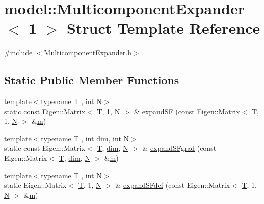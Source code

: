 \hypertarget{structmodel_1_1_multicomponent_expander_3_011_01_4}{}\section{model\+:\+:Multicomponent\+Expander$<$ 1 $>$ Struct Template Reference}
\label{structmodel_1_1_multicomponent_expander_3_011_01_4}


{\ttfamily \#include $<$Multicomponent\+Expander.\+h$>$}

\subsection*{Static Public Member Functions}
\begin{DoxyCompactItemize}
\item 
{\footnotesize template$<$typename T , int N$>$ }\\static const Eigen\+::\+Matrix$<$ \hyperlink{_spline_node_base__corder1_8h_a82692d3a5502b91460591f1d5504314a}{T}, 1, \hyperlink{thompson__tetrahedron_8m_a7823765a845eb81829f110d8337f81ae}{N} $>$ \& \hyperlink{structmodel_1_1_multicomponent_expander_3_011_01_4_a39e9d28d9850305d7a393e0a07779f37}{expand\+S\+F} (const Eigen\+::\+Matrix$<$ \hyperlink{_spline_node_base__corder1_8h_a82692d3a5502b91460591f1d5504314a}{T}, 1, \hyperlink{thompson__tetrahedron_8m_a7823765a845eb81829f110d8337f81ae}{N} $>$ \&\hyperlink{_longest_processing_time_8m_aa45df908642118b77cda186b3250197c}{m})
\item 
{\footnotesize template$<$typename T , int dim, int N$>$ }\\static const Eigen\+::\+Matrix$<$ \hyperlink{_spline_node_base__corder1_8h_a82692d3a5502b91460591f1d5504314a}{T}, \hyperlink{plot_nd_a_8m_a382f3ca768b275b8d563604f7fc7df73}{dim}, \hyperlink{thompson__tetrahedron_8m_a7823765a845eb81829f110d8337f81ae}{N} $>$ \& \hyperlink{structmodel_1_1_multicomponent_expander_3_011_01_4_ac5356ba3b0ee33742873fb5ec09d4066}{expand\+S\+Fgrad} (const Eigen\+::\+Matrix$<$ \hyperlink{_spline_node_base__corder1_8h_a82692d3a5502b91460591f1d5504314a}{T}, \hyperlink{plot_nd_a_8m_a382f3ca768b275b8d563604f7fc7df73}{dim}, \hyperlink{thompson__tetrahedron_8m_a7823765a845eb81829f110d8337f81ae}{N} $>$ \&\hyperlink{_longest_processing_time_8m_aa45df908642118b77cda186b3250197c}{m})
\item 
{\footnotesize template$<$typename T , int N$>$ }\\static Eigen\+::\+Matrix$<$ \hyperlink{_spline_node_base__corder1_8h_a82692d3a5502b91460591f1d5504314a}{T}, 1, \hyperlink{thompson__tetrahedron_8m_a7823765a845eb81829f110d8337f81ae}{N} $>$ \& \hyperlink{structmodel_1_1_multicomponent_expander_3_011_01_4_a175629c2f6128eab4b42b434d2bebbeb}{expand\+S\+Fdef} (const Eigen\+::\+Matrix$<$ \hyperlink{_spline_node_base__corder1_8h_a82692d3a5502b91460591f1d5504314a}{T}, 1, \hyperlink{thompson__tetrahedron_8m_a7823765a845eb81829f110d8337f81ae}{N} $>$ \&\hyperlink{_longest_processing_time_8m_aa45df908642118b77cda186b3250197c}{m})
\end{DoxyCompactItemize}


